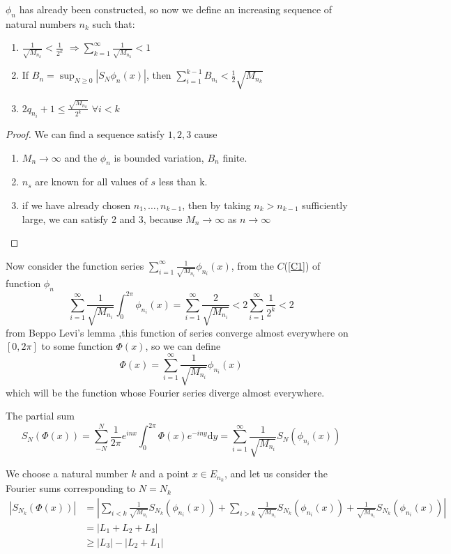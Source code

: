 \documentclass{article}
\begin{document}
$ \phi_n $ has already been constructed, so now we define an increasing sequence of natural numbers $ n_k $ such that:
\begin{enumerate}
    \item $ \frac{1}{\sqrt{M_{n_k}}}<\frac{1}{2^k} $  $\Rightarrow \sum_{k=1}^{\infty}\frac{1}{\sqrt{M_{n_k}}}< 1 $ 
    \item If $ B_n = \sup_{N \geqslant 0}|S_N\phi_n(x)|$, then $ \sum_{i=1}^{k-1}B_{n_i}<\frac{1}{2}\sqrt{M_{n_k}} $
    \item $ 2q_{n_i}+1 \leqslant \frac{\sqrt{M_{n_k}}}{2^k} $ $ \forall i < k  $
\end{enumerate} 
\begin{proof}

We can find a sequence satisfy $ 1,2,3 $ cause 
\begin{enumerate}
   
    \item $ M_n \rightarrow \infty $ and the $ \phi_n $ is bounded variation, $ B_n $ finite.
    \item $ n_s $ are known for all values of $ s  $  less than k.
    
    \item if we have already chosen  $ n_1,\dots ,n_{k-1} $, then by taking $ n_k >n_{k-1} $ sufficiently large, we can satisfy 2 and 3, because $  M_n \rightarrow \infty$ as $ n \rightarrow \infty $
\end{enumerate}
\end{proof}

Now consider the function series $ \sum_{i=1}^{\infty}\frac{1}{\sqrt{M_{n_i}}}\phi_{n_i} (x)$, from the $ C$(\ref{C1}) of function $ \phi_n $
\[ \sum_{i=1}^{\infty}\frac{1}{\sqrt{M_{n_i}}}\int_{0}^{2\pi}\phi_{n_i} (x) = \sum_{i=1}^{\infty}\frac{2}{\sqrt{M_{n_i}}}<2\sum_{i=1}^{\infty}\frac{1}{2^k} < 2\]
from Beppo Levi’s lemma ,this function of series converge almost everywhere on $ [0,2\pi] $ to some function $ \Phi(x) $, so we can define 
\[ \Phi(x)= \sum_{i=1}^{\infty}\frac{1}{\sqrt{M_{n_i}}}\phi_{n_i} (x)\] which will be the function whose Fourier series diverge almost everywhere.\par
The partial sum 
\[ S_N(\Phi(x))=\sum_{-N}^{N}\frac{1}{2\pi}e^{inx}\int_{0}^{2\pi}\Phi(x)e^{-iny}\mathrm{d}y  =\sum_{i=1}^{\infty}\frac{1}{\sqrt{M_{n_i}}}S_N(\phi_{n_i}(x))\]
\par
We choose a natural number $ k $ and a point $ x\in E_{n_k} $, and let us consider the Fourier sums corresponding to $ N=N_k $
\begin{align*}
    |S_{N_k}(\Phi(x))|&=|\sum_{i<k}\frac{1}{\sqrt{M_{n_i}}}S_{N_k}(\phi_{n_i}(x))+\sum_{i>k}\frac{1}{\sqrt{M_{n_i}}}S_{N_k}(\phi_{n_i}(x))+\frac{1}{\sqrt{M_{n_i}}}S_{N_k}(\phi_{n_i}(x))|\\
    &=|L_1+L_2+L_3|\\
    &\geqslant |L_3| -|L_2+L_1|
\end{align*}
 
\end{document}
